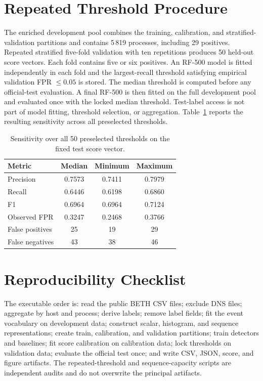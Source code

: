 \documentclass[10pt,journal,compsoc]{IEEEtran}
\begin{document}
\section{Repeated Threshold Procedure}

The enriched development pool combines the training, calibration, and
stratified-validation partitions and contains 5\,819 processes, including 29
positives. Repeated stratified five-fold validation with ten repetitions
produces 50 held-out score vectors. Each fold contains five or six positives.
An RF-500 model is fitted independently in each fold and the largest-recall
threshold satisfying empirical validation FPR $\leq0.05$ is stored. The median
threshold is computed before any official-test evaluation. A final RF-500 is
then fitted on the full development pool and evaluated once with the locked
median threshold. Test-label access is not part of model fitting, threshold
selection, or aggregation. Table~\ref{tab:supp_threshold_sensitivity} reports
the resulting sensitivity across all preselected thresholds.

\begin{table}[t]
\centering
\caption{Sensitivity over all 50 preselected thresholds on the fixed test score vector.}
\label{tab:supp_threshold_sensitivity}
\begin{tabular}{lccc}
\toprule
\textbf{Metric} & \textbf{Median} & \textbf{Minimum} & \textbf{Maximum} \\
\midrule
Precision & 0.7573 & 0.7411 & 0.7979 \\
Recall & 0.6446 & 0.6198 & 0.6860 \\
F1 & 0.6964 & 0.6964 & 0.7124 \\
Observed FPR & 0.3247 & 0.2468 & 0.3766 \\
False positives & 25 & 19 & 29 \\
False negatives & 43 & 38 & 46 \\
\bottomrule
\end{tabular}
\end{table}

\section{Reproducibility Checklist}

The executable order is: read the public BETH CSV files; exclude DNS files;
aggregate by host and process; derive labels; remove label fields; fit the
event vocabulary on development data; construct scalar, histogram, and
sequence representations; create train, calibration, and validation
partitions; train detectors and baselines; fit score calibration on calibration
data; lock thresholds on validation data; evaluate the official test once; and
write CSV, JSON, score, and figure artifacts. The repeated-threshold and
sequence-capacity scripts are independent audits and do not overwrite the
principal artifacts.
\end{document}
